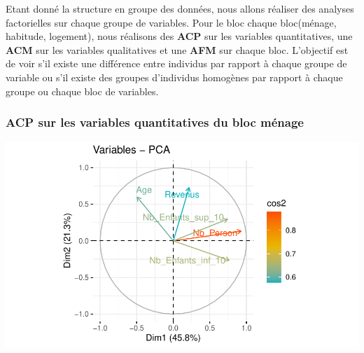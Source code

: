 \documentclass[11pt,a4paper, x11names]{article}\usepackage[]{graphicx}\usepackage[]{color}
\makeatletter
\def\maxwidth{ %
  \ifdim\Gin@nat@width>\linewidth
    \linewidth
  \else
    \Gin@nat@width
  \fi
}
\newenvironment{knitrout}{}{} %
\makeatother
\begin{document}
\par Etant donné la structure en groupe des données, nous allons réaliser des analyses factorielles sur
chaque groupe de variables. Pour le bloc chaque bloc(ménage, habitude, logement), nous réalisons des \textbf{ACP} sur les variables quantitatives, une \textbf{ACM} sur les variables qualitatives et une \textbf{AFM} sur chaque bloc. L'objectif est de voir s'il existe une différence entre individus par rapport à chaque groupe de variable ou s'il existe des groupes d'individus homogènes par rapport à chaque groupe ou chaque bloc de variables.

\subsubsection{ACP sur les variables quantitatives du bloc ménage}
\begin{minipage}{0.49\linewidth}
\begin{mdframed}
\begin{knitrout}
\color{fgcolor}
\includegraphics[width=\maxwidth]{figure/unnamed-chunk-2-1} 
\end{knitrout}
\end{mdframed}
\end{minipage}
\hfill
\end{document}
